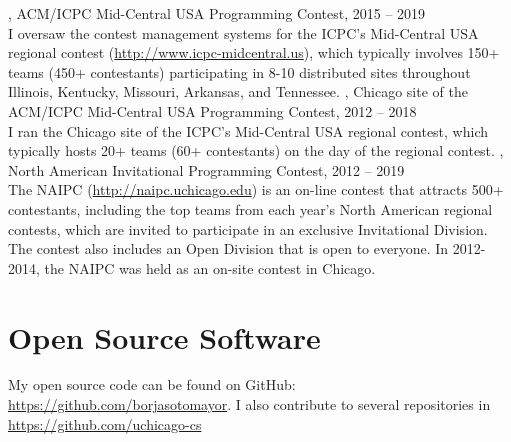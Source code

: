 \documentclass{resume}
\begin{document}
\begin{category}{}
, ACM/ICPC Mid-Central USA Programming Contest, 2015 -- 2019\\
I oversaw the contest management systems for the ICPC's Mid-Central USA regional contest (\url{http://www.icpc-midcentral.us}), which typically involves 150+ teams (450+ contestants) participating in 8-10 distributed sites throughout Illinois, Kentucky, Missouri, Arkansas, and Tennessee.
, Chicago site of the ACM/ICPC Mid-Central USA Programming Contest, 2012 -- 2018\\
I ran the Chicago site of the ICPC's Mid-Central USA regional contest, which typically hosts 20+ teams (60+ contestants) on the day of the regional contest.
, North American Invitational Programming Contest, 2012 -- 2019\\
The NAIPC (\url{http://naipc.uchicago.edu}) is an on-line contest that attracts 500+ contestants, including the top teams from each year's North American regional contests, which are invited to participate in an exclusive Invitational Division. The contest also includes an Open Division that is open to everyone. In 2012-2014, the NAIPC was held as an on-site contest in Chicago.
\end{category}


\section*{\hspace{-1cm}Open Source Software}

My open source code can be found on GitHub: \url{https://github.com/borjasotomayor}. I also contribute to several repositories in \url{https://github.com/uchicago-cs}
\end{document}
